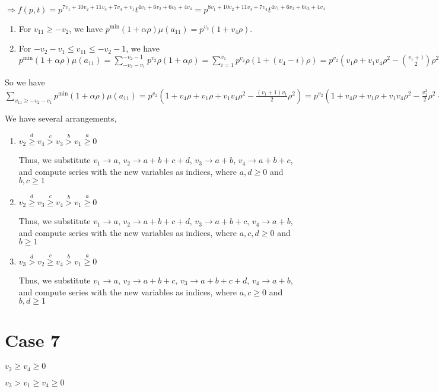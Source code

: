 \documentclass{article}
\begin{document}
     $\Rightarrow{f(p,t)=p^{7v_1+10v_2+11v_3+7v_4+v_1}t^{4v_1+6v_2+6v_3+4v_4}=p^{8v_1+10v_2+11v_3+7v_4}t^{4v_1+6v_2+6v_3+4v_4}}$
\begin{enumerate}
    \item 
For $v_{11}\geq{-v_2}$, we have $p^{\min}(1+\alpha\rho)\mu(a_{11})=p^{v_2}(1+v_4\rho).$
\item 
For $-v_2-v_1\leq{v_{11}}\leq{-v_2-1}$, we have $p^{\min}(1+\alpha\rho)\mu(a_{11})=\sum_{-v_2-v_1}^{-v_2-1}p^{v_2}\rho(1+\alpha\rho)=\sum_{i=1}^{v_1}p^{v_2}\rho(1+(v_4-i)\rho)=p^{v_2}(v_1\rho+v_1v_4\rho^2-\binom{v_1+1}{2}\rho^2).$
\end{enumerate}
So we have $\sum_{v_{11}\geq{-v_2-v_1}}p^{\min}(1+\alpha\rho)\mu(a_{11})=p^{v_2}(1+v_4\rho+v_1\rho+v_1v_4\rho^2-\frac{(v_1+1)v_1}{2}\rho^2)=p^{v_2}(1+v_4\rho+v_1\rho+v_1v_4\rho^2-\frac{v_1^2}{2}\rho^2-\frac{v_1}{2}\rho^2).$

We have several arrangements,
\begin{enumerate}
    \item 
$v_2\overset{d}{\geq}v_4\overset{c}{>}v_3\overset{b}{>}{v_1}\overset{a}{\geq}{0}$

Thus, we substitute $v_1\rightarrow{a}$, $v_2\rightarrow{a+b+c+d}$, $v_3\rightarrow{a+b}$, $v_4\rightarrow{a+b+c}$, and compute series with the new variables as indices, where $a,d\geq{0}$ and $b,c\geq{1}$
    \item 
$v_2\overset{d}{\geq}v_3\overset{c}{\geq}v_4\overset{b}{>}{v_1}\overset{a}{\geq}{0}$

Thus, we substitute $v_1\rightarrow{a}$, $v_2\rightarrow{a+b+c+d}$, $v_3\rightarrow{a+b+c}$, $v_4\rightarrow{a+b}$, and compute series with the new variables as indices, where $a,c,d\geq{0}$ and $b\geq{1}$
    \item 
$v_3\overset{d}{>}v_2\overset{c}{\geq}v_4\overset{b}{>}{v_1}\overset{a}{\geq}{0}$

Thus, we substitute $v_1\rightarrow{a}$, $v_2\rightarrow{a+b+c}$, $v_3\rightarrow{a+b+c+d}$, $v_4\rightarrow{a+b}$, and compute series with the new variables as indices, where $a,c\geq{0}$ and $b,d\geq{1}$

\end{enumerate}

\section{Case 7}
$v_2\geq{v_4}\geq{0}$

$v_3>v_1\geq{v_4}\geq{0}$
\end{document}
